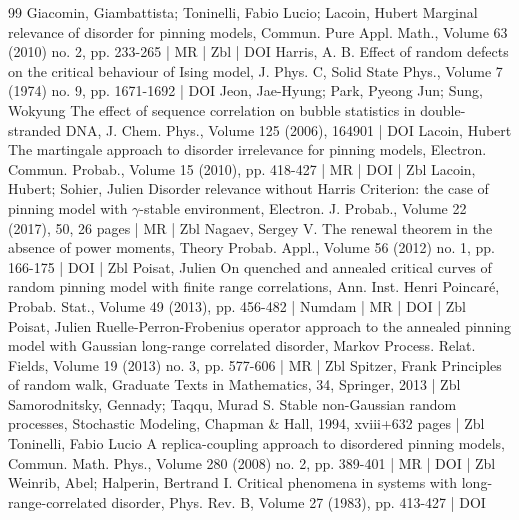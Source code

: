 \begin{thebibliography}{99}
Giacomin, Giambattista; Toninelli, Fabio Lucio; Lacoin, Hubert Marginal relevance of disorder for pinning models, Commun. Pure Appl. Math., Volume 63 (2010) no. 2, pp. 233-265 | MR | Zbl | DOI
Harris, A. B. Effect of random defects on the critical behaviour of Ising model, J. Phys. C, Solid State Phys., Volume 7 (1974) no. 9, pp. 1671-1692 | DOI
Jeon, Jae-Hyung; Park, Pyeong Jun; Sung, Wokyung The effect of sequence correlation on bubble statistics in double-stranded DNA, J. Chem. Phys., Volume 125 (2006), 164901 | DOI
Lacoin, Hubert The martingale approach to disorder irrelevance for pinning models, Electron. Commun. Probab., Volume 15 (2010), pp. 418-427 | MR | DOI | Zbl
Lacoin, Hubert; Sohier, Julien Disorder relevance without Harris Criterion: the case of pinning model with \ensuremath{\gamma}-stable environment, Electron. J. Probab., Volume 22 (2017), 50, 26 pages | MR | Zbl
Nagaev, Sergey V. The renewal theorem in the absence of power moments, Theory Probab. Appl., Volume 56 (2012) no. 1, pp. 166-175 | DOI | Zbl
Poisat, Julien On quenched and annealed critical curves of random pinning model with finite range correlations, Ann. Inst. Henri Poincaré, Probab. Stat., Volume 49 (2013), pp. 456-482 | Numdam | MR | DOI | Zbl
Poisat, Julien Ruelle-Perron-Frobenius operator approach to the annealed pinning model with Gaussian long-range correlated disorder, Markov Process. Relat. Fields, Volume 19 (2013) no. 3, pp. 577-606 | MR | Zbl
Spitzer, Frank Principles of random walk, Graduate Texts in Mathematics, 34, Springer, 2013 | Zbl
Samorodnitsky, Gennady; Taqqu, Murad S. Stable non-Gaussian random processes, Stochastic Modeling, Chapman \& Hall, 1994, xviii+632 pages | Zbl
Toninelli, Fabio Lucio A replica-coupling approach to disordered pinning models, Commun. Math. Phys., Volume 280 (2008) no. 2, pp. 389-401 | MR | DOI | Zbl
Weinrib, Abel; Halperin, Bertrand I. Critical phenomena in systems with long-range-correlated disorder, Phys. Rev. B, Volume 27 (1983), pp. 413-427 | DOI
\end{thebibliography}
